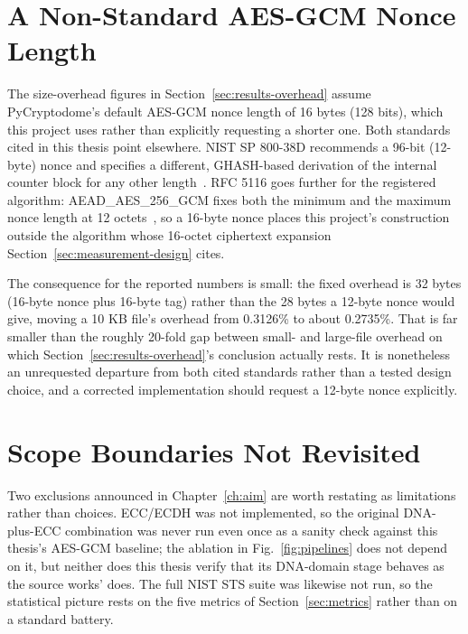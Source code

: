 \documentclass[12pt,a4paper,twoside]{report}
\numberwithin{equation}{chapter}
\begin{document}
\section{A Non-Standard AES-GCM Nonce Length}
\label{sec:limits-nonce}
The size-overhead figures in Section~\ref{sec:results-overhead} assume
PyCryptodome's default AES-GCM nonce length of 16 bytes (128 bits),
which this project uses rather than explicitly requesting a shorter
one. Both standards cited in this thesis point elsewhere. NIST SP
800-38D recommends a 96-bit (12-byte) nonce and specifies a different,
GHASH-based derivation of the internal counter block for any other
length~\cite{nist80038d}. RFC 5116 goes further for the registered
algorithm: AEAD\_AES\_256\_GCM fixes both the minimum and the maximum
nonce length at 12 octets~\cite{rfc5116}, so a 16-byte nonce places
this project's construction outside the algorithm whose 16-octet
ciphertext expansion Section~\ref{sec:measurement-design} cites.

The consequence for the reported numbers is small: the fixed overhead
is 32 bytes (16-byte nonce plus 16-byte tag) rather than the 28 bytes
a 12-byte nonce would give, moving a 10 KB file's overhead from
0.3126\% to about 0.2735\%. That is far smaller than the roughly
20-fold gap between small- and large-file overhead on which
Section~\ref{sec:results-overhead}'s conclusion actually rests. It is
nonetheless an unrequested departure from both cited standards rather
than a tested design choice, and a corrected implementation should
request a 12-byte nonce explicitly.

\section{Scope Boundaries Not Revisited}
Two exclusions announced in Chapter~\ref{ch:aim} are worth restating as
limitations rather than choices. ECC/ECDH was not implemented, so the
original DNA-plus-ECC combination was never run even once as a sanity
check against this thesis's AES-GCM baseline; the ablation in
Fig.~\ref{fig:pipelines} does not depend on it, but neither does this
thesis verify that its DNA-domain stage behaves as the source works'
does. The full NIST STS suite was likewise not run, so the statistical
picture rests on the five metrics of Section~\ref{sec:metrics} rather
than on a standard battery.

\end{document}
